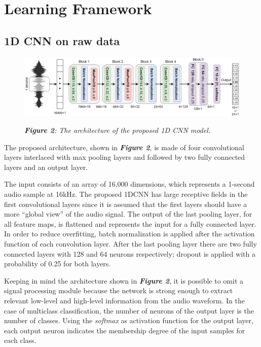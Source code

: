 \documentclass[conference]{IEEEtran}
\begin{document}
\section{Learning Framework}
\subsection{1D CNN on raw data}

\begin{figure}
\centering
\includegraphics[scale=0.16]{1DCNN}

\begin{small}\textit{\textbf{Figure 2}: The architecture of the proposed 1D CNN model.}
\end{small}
\end{figure}

The proposed architecture, shown in \textbf{\textit{Figure 2}}, is made of four convolutional layers interlaced with max pooling layers and followed by two fully connected layers and an output layer.

The input consists of an array of 16,000 dimensions, which represents a 1-second audio sample at 16kHz.
The proposed 1DCNN has large receptive fields in the first convolutional layers since it is assumed that the first layers should have a more “global view” of the audio signal. The output of the last pooling layer, for all feature maps, is flattened and represents the input for a fully connected layer. In order to reduce overfitting, batch normalization is applied after the activation function of each convolution layer. After the last pooling layer there are two fully connected layers with 128 and 64 neurons respectively; dropout is applied with a probability of 0.25 for both layers.

Keeping in mind the architecture shown in \textbf{\textit{Figure 2}}, it is possible to omit a signal processing module because the network is strong enough to extract relevant low-level and high-level information from the audio waveform.
In the case of multiclass classification, the number of neurons of the output layer is the number of classes. Using the \textit{softmax} as activation function for the output layer, each output neuron indicates the membership degree of the input samples for each class.
\end{document}
